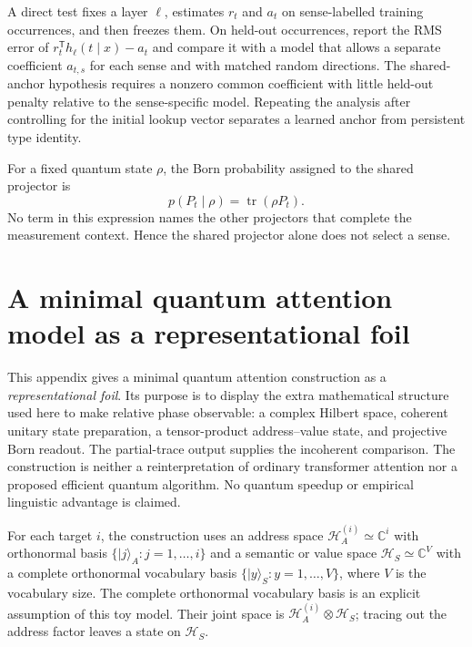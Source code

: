 \documentclass[
  aps,
  reprint,
  superscriptaddress,
  floatfix,
  nofootinbib,
  longbibliography
]{revtex4-2}
\newcommand{\T}{^{\mathsf T}}
\begin{document}
A direct test fixes a layer $\ell$, estimates $r_t$ and $a_t$ on
sense-labelled training occurrences, and then freezes them.  On held-out
occurrences, report the RMS error of $r_t\T h_\ell(t\mid x)-a_t$ and compare it
with a model that allows a separate coefficient $a_{t,s}$ for each sense and
with matched random directions.  The shared-anchor hypothesis requires a
nonzero common coefficient with little held-out penalty relative to the
sense-specific model.  Repeating the analysis after controlling for the
initial lookup vector separates a learned anchor from persistent type identity.

For a fixed quantum state $\rho$, the Born probability assigned to the shared
projector is
\begin{equation}
 p(P_t\mid\rho)=\operatorname{tr}(\rho P_t).
 \label{eq:born-shared-app}
\end{equation}
No term in this expression names the other projectors that complete the
measurement context.  Hence the shared projector alone does not select a
sense.


\section{A minimal quantum attention model as a representational foil}
\label{app:quantum-attention}

This appendix gives a minimal quantum attention construction as a
\emph{representational foil}.  Its purpose is to display the extra mathematical
structure used here to make relative phase observable: a complex Hilbert
space, coherent unitary state preparation, a tensor-product address--value
state, and projective Born readout.  The partial-trace output supplies the
incoherent comparison.  The construction is neither a reinterpretation of
ordinary transformer attention nor a proposed efficient quantum algorithm.
No quantum speedup or empirical linguistic advantage is claimed.

For each target $i$, the construction uses an address space
$\mathcal H_A^{(i)}\simeq\mathbb C^i$ with orthonormal basis
$\{|j\rangle_A:j=1,\ldots,i\}$ and a semantic or value space
$\mathcal H_S\simeq\mathbb C^V$ with a complete orthonormal vocabulary basis
$\{|y\rangle_S:y=1,\ldots,V\}$, where $V$ is the vocabulary size.  The
complete orthonormal vocabulary basis is
an explicit assumption of this toy model.  Their joint space is
$\mathcal H_A^{(i)}\otimes\mathcal H_S$; tracing out the address factor leaves
a state on $\mathcal H_S$.
\end{document}
